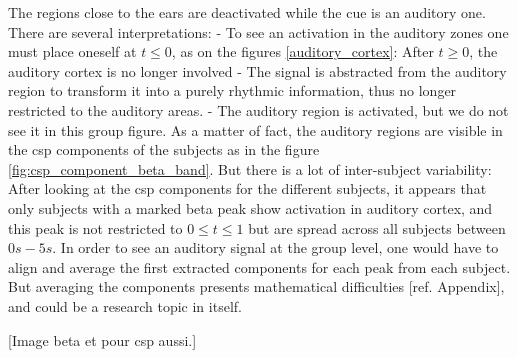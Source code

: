 The regions close to the ears are deactivated while the cue is an auditory one. There are several interpretations:
- To see an activation in the auditory zones one must place oneself at $t \leq 0$, as on the figures \ref{auditory_cortex}: After $t \geq 0$, the auditory cortex is no longer involved
- The signal is abstracted from the auditory region to transform it into a purely rhythmic information, thus no longer restricted to the auditory areas.
- The auditory region is activated, but we do not see it in this group figure. As a matter of fact, the auditory regions are visible in the csp components of the subjects as in the figure \ref{fig:csp_component_beta_band}. But there is a lot of inter-subject variability: After looking at the csp components for the different subjects, it appears that only subjects with a marked beta peak show activation in auditory cortex, and this peak is not restricted to $0 \leq t \leq 1$ but are spread across all subjects between $0s - 5s$. In order to see an auditory signal at the group level, one would have to align and average the first extracted components for each peak from each subject. But averaging the components presents mathematical difficulties [ref. Appendix], and could be a research topic in itself.

[Image beta et pour csp aussi.]


